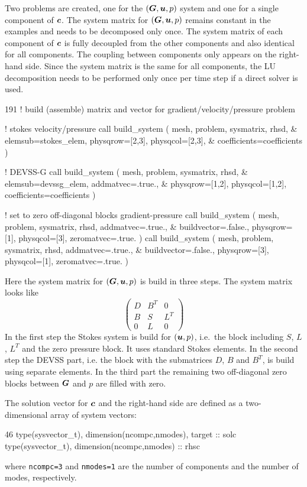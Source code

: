 Two problems are created, one for the $(\boldsymbol{G},\boldsymbol{u}, p)$ system and one for
a single component of $\boldsymbol{c}$. The system matrix for $(\boldsymbol{G},\boldsymbol{u}, p)$
remains constant in the examples and needs to be decomposed only once.
The system matrix of each component
of $\boldsymbol{c}$ is fully decoupled from the other components and also identical
for all
components. The coupling between components only appears on the right-hand side.
Since the system matrix is the same for all components, the LU decomposition
needs to be performed only once per time step if a direct solver is used.

\begin{listing}{191}
! build (assemble) matrix and vector for gradient/velocity/pressure problem

! stokes velocity/pressure
  call build_system ( mesh, problem, sysmatrix, rhsd, &
    elemsub=stokes_elem, physqrow=[2,3], physqcol=[2,3], &
    coefficients=coefficients )

! DEVSS-G
  call build_system ( mesh, problem, sysmatrix, rhsd, &
    elemsub=devssg_elem, addmatvec=.true., &
    physqrow=[1,2], physqcol=[1,2], coefficients=coefficients )

! set to zero off-diagonal blocks gradient-pressure
  call build_system ( mesh, problem, sysmatrix, rhsd, addmatvec=.true., &
    buildvector=.false., physqrow=[1], physqcol=[3], zeromatvec=.true. )
  call build_system ( mesh, problem, sysmatrix, rhsd, addmatvec=.true., &
    buildvector=.false., physqrow=[3], physqcol=[1], zeromatvec=.true. )
   
\end{listing}

Here the system matrix for $(\boldsymbol{G},\boldsymbol{u}, p)$ is build in three steps. The
system matrix looks like
\[
   \begin{pmatrix}
      D  &  B^T  &  0 \\
      B  &  S    &  L^T \\
      0  &  L    &  0  
   \end{pmatrix}
\]
In the first step the Stokes system is build for $(\boldsymbol{u},p)$, i.e.\ the block
including $S$, $L$, $L^T$ and the zero pressure block. It uses standard Stokes
elements. In the second step the
DEVSS part, i.e. the block with the submatrices $D$, $B$ and $B^T$,
is build using separate elements. In the third part the remaining two
off-diagonal zero
blocks between $\boldsymbol{G}$ and $p$ are filled with zero.

The solution vector for $\boldsymbol{c}$ and the right-hand side are defined as a
two-dimensional array of system vectors:
\begin{listing}{46}
  type(sysvector_t), dimension(ncompc,nmodes), target :: solc
  type(sysvector_t), dimension(ncompc,nmodes) :: rhsc
\end{listing}
where \texttt{ncompc=3} and \texttt{nmodes=1} are the number of components
and the number of modes, respectively.

